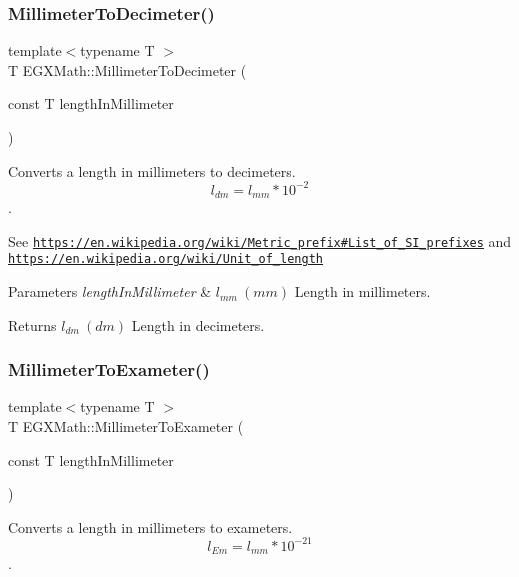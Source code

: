 \subsubsection{\texorpdfstring{Millimeter\+To\+Decimeter()}{MillimeterToDecimeter()}}
{\footnotesize\ttfamily template$<$typename T $>$ \\
T E\+G\+X\+Math\+::\+Millimeter\+To\+Decimeter (\begin{DoxyParamCaption}\item[{const T}]{length\+In\+Millimeter }\end{DoxyParamCaption})}



Converts a length in millimeters to decimeters. \[ l_{dm}=l_{mm} * 10^{-2} \]. 

See \href{https://en.wikipedia.org/wiki/Metric_prefix#List_of_SI_prefixes}{\tt https\+://en.\+wikipedia.\+org/wiki/\+Metric\+\_\+prefix\#\+List\+\_\+of\+\_\+\+S\+I\+\_\+prefixes} and \href{https://en.wikipedia.org/wiki/Unit_of_length}{\tt https\+://en.\+wikipedia.\+org/wiki/\+Unit\+\_\+of\+\_\+length} 
\begin{DoxyParams}{Parameters}
{\em length\+In\+Millimeter} & $ l_{mm}\ (mm)$ Length in millimeters. \\
\hline
\end{DoxyParams}
\begin{DoxyReturn}{Returns}
$ l_{dm}\ (dm)$ Length in decimeters. 
\end{DoxyReturn}
\mbox{\label{group___e_g_x_math-_conversions-_length_conversions-_millimeter-_s_i_gaceb47f60171d86e6d552801e9a552530}} 
\subsubsection{\texorpdfstring{Millimeter\+To\+Exameter()}{MillimeterToExameter()}}
{\footnotesize\ttfamily template$<$typename T $>$ \\
T E\+G\+X\+Math\+::\+Millimeter\+To\+Exameter (\begin{DoxyParamCaption}\item[{const T}]{length\+In\+Millimeter }\end{DoxyParamCaption})}



Converts a length in millimeters to exameters. \[ l_{Em}=l_{mm} * 10^{-21} \]. 

